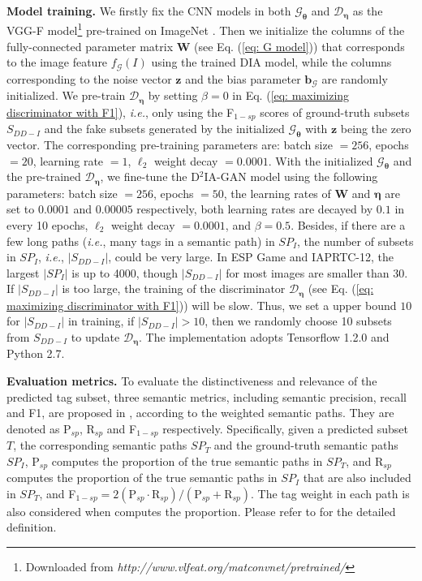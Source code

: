 \documentclass[10pt,twocolumn,letterpaper]{article}
\newcommand{\z}{\mathbf{z}}
\newcommand{\W}{\mathbf{W}}
\newcommand{\D}{\mathcal{D}}
\newcommand{\G}{\mathcal{G}}
\begin{document}
\vspace{3pt}
\noindent
{\bf Model training.} 
We firstly fix the CNN models in both $\G_{\boldsymbol{\theta}}$ and $\D_{\boldsymbol{\eta}}$ as the VGG-F model\footnote{Downloaded from {\it http://www.vlfeat.org/matconvnet/pretrained/}} pre-trained on ImageNet \cite{imagenet-cvpr-2009}. Then we initialize the columns of the fully-connected parameter matrix $\W$ (see Eq. (\ref{eq: G model})) that corresponds to the image feature $f_{\G}(I)$ using the trained DIA model, while the columns corresponding to the noise vector $\z$ and the bias parameter $\mathbf{b}_{\G}$ are randomly initialized. 
%
We pre-train $\D_{\boldsymbol{\eta}}$ by setting $\beta=0$ in Eq. (\ref{eq: maximizing discriminator with F1}), {\it i.e.}, only using the F$_{1-sp}$ scores of ground-truth subsets $S_{DD-I}$ and the fake subsets generated by the initialized $\G_{\boldsymbol{\theta}}$ with $\z$ being the zero vector. The corresponding pre-training parameters are: batch size $=256$, epochs $=20$, learning rate $=1$, $\ell_2$ weight decay $=0.0001$. 
%
With the initialized $\G_{\boldsymbol{\theta}}$ and the pre-trained $\D_{\boldsymbol{\eta}}$, we fine-tune the D$^2$IA-GAN model using the following parameters: batch size $=256$, epochs $=50$,  the learning rates of $\W$ and $\boldsymbol{\eta}$  are set to $0.0001$ and $0.00005$ respectively, both learning rates are decayed by $0.1$ in every 10 epochs, $\ell_2$ weight decay $=0.0001$, and $\beta=0.5$. 
%
Besides, if there are a few long paths ({\it i.e.}, many tags in a semantic path) in $SP_{I}$, the number of subsets in $SP_{I}$, {\it i.e.}, $|S_{DD-I}|$, could be very large. In ESP Game and IAPRTC-12, the largest $|SP_{I}|$ is up to 4000, though $|S_{DD-I}|$ for most images are smaller than 30. If $|S_{DD-I}|$ is too large, the training of the discriminator $\D_{\boldsymbol{\eta}}$ (see Eq. (\ref{eq: maximizing discriminator with F1})) will be slow. Thus, we set a upper bound $10$ for $|S_{DD-I}|$ in training, if $|S_{DD-I}| > 10$, then we randomly choose 10 subsets from $S_{DD-I}$ to update $\D_{\boldsymbol{\eta}}$.
The implementation adopts Tensorflow 1.2.0 and Python 2.7.  

\vspace{3pt}
\noindent
{\bf Evaluation metrics.}  
To evaluate the distinctiveness and relevance of the predicted tag subset, three semantic metrics, including semantic precision, recall and F1, are proposed in \cite{my-cvpr-2017-dia}, according to the weighted semantic paths. They are denoted as P$_{sp}$,  R$_{sp}$ and F$_{1-sp}$ respectively. Specifically, given a predicted subset $T$, the corresponding semantic paths $SP_T$ and the ground-truth semantic paths $SP_I$, P$_{sp}$ computes the proportion of the true semantic paths in $SP_T$, and R$_{sp}$ computes the proportion of the true semantic paths in $SP_I$ that are also included in $SP_T$, and F$_{1-sp} = 2(\text{P}_{sp} \cdot \text{R}_{sp}) / (\text{P}_{sp} + \text{R}_{sp})$. The tag weight in each path is also considered when computes the proportion.  
Please refer to \cite{my-cvpr-2017-dia} for the detailed definition.
\end{document}
